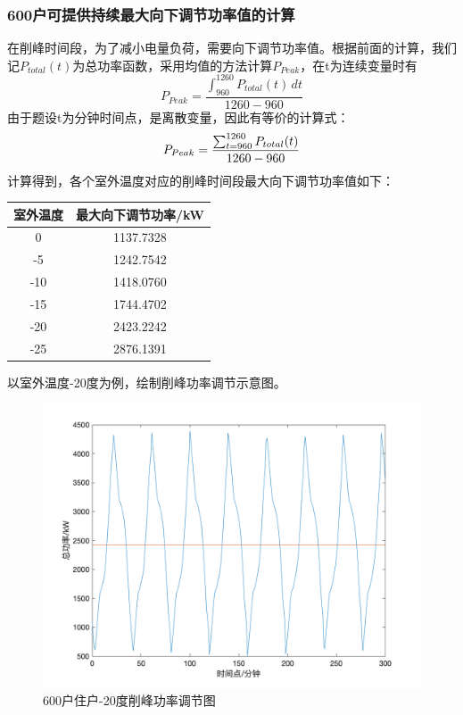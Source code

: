\documentclass[withoutpreface,bwprint]{cumcmthesis} %
\begin{document}
    \subsubsection{600户可提供持续最大向下调节功率值的计算}
    在削峰时间段，为了减小电量负荷，需要向下调节功率值。根据前面的计算，我们记$P_{total}(t)$为总功率函数，采用均值的方法计算$P_{Peak}$，在t为连续变量时有
    $$
    P_{Peak} =\frac{\int_{960}^{1260}P_{total}(t) \, dt}{1260-960} 
    $$
    由于题设t为分钟时间点，是离散变量，因此有等价的计算式：
    $$
    P_{Peak} =\frac{\sum_{t=960}^{1260} P_{total}(t)}{1260-960}  \\
    $$
        计算得到，各个室外温度对应的削峰时间段最大向下调节功率值如下：
    \begin{table}[H]
    \centering
    \begin{tabular}{|c|c|}\hline
 室外温度 &最大向下调节功率/kW \\ \hline
0	& 1137.7328 \\ \hline
-5 &	1242.7542  \\ \hline
-10&	 1418.0760\\ \hline
-15&  1744.4702\\ \hline
-20 &	2423.2242  \\ \hline
-25 &	2876.1391 \\ \hline
	\end{tabular}
\end{table}
以室外温度-20度为例，绘制削峰功率调节示意图。
\begin{figure}[H]
    \centering
        \includegraphics[width=1\textwidth]{figures/5-1-20.png}
    \caption{600户住户-20度削峰功率调节图}
    \label{fig:my_label}
    \end{figure}
\end{document}
